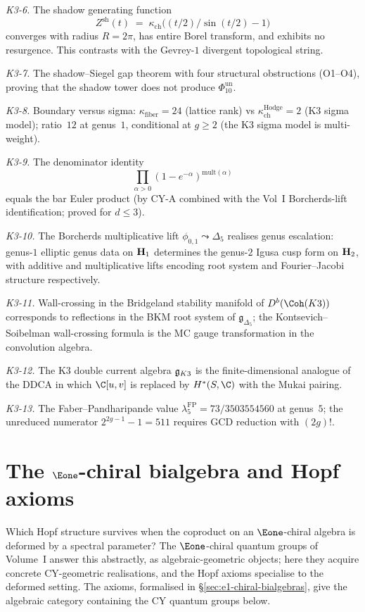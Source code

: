 \emph{K3-6.} The shadow generating function
\[
 Z^{\mathrm{sh}}(t)
 \;=\; \kappa_{\mathrm{ch}}\!\bigl((t/2)/\sin(t/2) - 1\bigr)
\]
converges with radius $R = 2\pi$, has entire Borel transform,
and exhibits no resurgence. This contrasts with the Gevrey-$1$
divergent topological string.

\emph{K3-7.} The shadow--Siegel gap theorem with four
structural obstructions (O1--O4), proving that the shadow
tower does not produce $\Phi_{10}^{\mathrm{un}}$.

\emph{K3-8.} Boundary versus sigma:
$\kappa_{\mathrm{fiber}} = 24$ (lattice rank) vs
$\kappa_{\mathrm{ch}}^{\mathrm{Hodge}} = 2$ (K3 sigma model); ratio~$12$ at
genus~$1$, conditional at $g \geq 2$ (the K3 sigma model is
multi-weight).

\emph{K3-9.} The denominator identity
\[
 \prod_{\alpha > 0}(1 - e^{-\alpha})^{\mathrm{mult}(\alpha)}
\]
equals the bar Euler product (by CY-A combined with the Vol~I
Borcherds-lift identification; proved for $d \leq 3$).

\emph{K3-10.} The Borcherds multiplicative lift
$\phi_{0,1} \leadsto \Delta_5$ realises genus escalation:
genus-$1$ elliptic genus data on $\mathbf{H}_1$ determines the
genus-$2$ Igusa cusp form on $\mathbf{H}_2$, with additive and
multiplicative lifts encoding root system and
Fourier--Jacobi structure respectively.

\emph{K3-11.} Wall-crossing in the Bridgeland stability
manifold of $D^b(\Coh(K3))$ corresponds to reflections in the
BKM root system of $\mathfrak{g}_{\Delta_5}$; the
Kontsevich--Soibelman wall-crossing formula is the MC gauge
transformation in the convolution algebra.

\emph{K3-12.} The K3 double current algebra $\mathfrak{g}_{K3}$ is the
finite-dimensional analogue of the DDCA in which $\C[u, v]$ is
replaced by $H^*(S, \C)$ with the Mukai pairing.

\emph{K3-13.} The Faber--Pandharipande value
$\lambda_5^{\mathrm{FP}} = 73/3503554560$ at genus~$5$; the
unreduced numerator $2^{2g-1} - 1 = 511$ requires GCD
reduction with $(2g)!$.

\section{The \texorpdfstring{$\Eone$}{E1}-chiral bialgebra and Hopf axioms}
\label{sec:e1-bialgebra-intro}

Which Hopf structure survives when the coproduct on an
$\Eone$-chiral algebra is deformed by a spectral parameter? The
$\Eone$-chiral quantum groups of Volume~I answer this abstractly,
as algebraic-geometric objects; here they acquire concrete
CY-geometric realisations, and the Hopf axioms specialise to the
deformed setting. The axioms, formalised in
\S\ref{sec:e1-chiral-bialgebras}, give the algebraic category
containing the CY quantum groups below.

